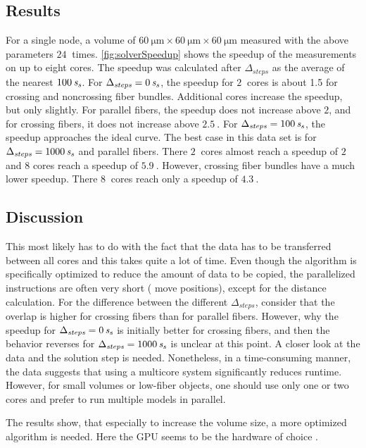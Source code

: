 \subsection{Results}
For a single node, a volume of $\SI{60}{\micro\meter} \times \SI{60}{\micro\meter} \times \SI{60}{\micro\meter}$ measured with the above parameters $\SI{24}{}$ times.
\cref{fig:solverSpeedup} shows the speedup of the measurements on up to eight cores.
The speedup was calculated after $\Delta_{\mathit{steps}}$ as the average of the nearest $\SI{100}{\textnormal{$\mathit{s_{s}}$}}$.
For $\Delta_{\mathit{steps}} = \SI{0}{\textnormal{$\mathit{s_{s}}$}}$, the speedup for $\SI{2}{}$ cores is about 1.5 for crossing and noncrossing fiber bundles.
Additional cores increase the speedup, but only slightly.
For parallel fibers, the speedup does not increase above $2$, and for crossing fibers, it does not increase above $\SI{2.5}{}$.
For $\Delta_{\mathit{steps}} = \SI{100}{\textnormal{$\mathit{s_{s}}$}}$, the speedup approaches the ideal curve.
The best case in this data set is for $\Delta_{\mathit{steps}} = \SI{1000}{\textnormal{$\mathit{s_{s}}$}}$ and parallel fibers. There $\SI{2}{}$ cores almost reach a speedup of $2$ and 8 cores reach a speedup of $\SI{5.9}{}$.
However, crossing fiber bundles have a much lower speedup.
There $\SI{8}{}$ cores reach only a speedup of $\SI{4.3}{}$.
% 
\subsection{Discussion}
This most likely has to do with the fact that the data has to be transferred between all cores and this takes quite a lot of time.
Even though the algorithm is specifically optimized to reduce the amount of data to be copied, the parallelized instructions are often very short (\eg{} move positions), except for the distance calculation.
For the difference between the different $\Delta_{\mathit{steps}}$, consider that the overlap is higher for crossing fibers than for parallel fibers.
However, why the speedup for $\Delta_{\mathit{steps}}=\SI{0}{\textnormal{$\mathit{s_{s}}$}}$ is initially better for crossing fibers, and then the behavior reverses for $\Delta_{\mathit{steps}}=\SI{1000}{\textnormal{$\mathit{s_{s}}$}}$ is unclear at this point. 
A closer look at the data and the solution step is needed.
Nonetheless, in a time-consuming manner, the data suggests that using a multicore system significantly reduces runtime.
However, for small volumes or low-fiber objects, one should use only one or two cores and prefer to run multiple models in parallel.
\par
% 
The results show, that especially to increase the volume size, a more optimized algorithm is needed.
Here the \ac{GPU} seems to be the hardware of choice \cite{Karras2012}.
% 
% 
% 
